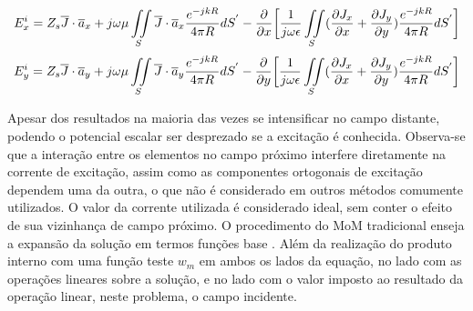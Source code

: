 \documentclass[
	12pt,				%
	openright,			%
	oneside,			%
	a4papey79r,			%
	english,			%
	brazil				%
	]{abntex2}
\begin{document}
\begin{equation}{\label{CampoExTangencialEmFunçãoJ}}
  E_{x}^i=Z_s \overline{J}\cdot \overline{a}_x+j\omega \mu \iint\limits_S \overline{J}\cdot \overline{a}_x\frac{e^{-j k R}}{4 \pi R} dS^{'} -
     \frac{\partial }{\partial x}  \biggl[ \frac{1}{j\omega \epsilon}\iint\limits_S  (\frac{\partial J_x}{\partial x}+ \frac{\partial J_y}{\partial y} ) \frac{e^{-j k R}}{4 \pi R} dS^{'}  \biggl] 
\end{equation}
\begin{equation}{\label{CampoEyTangencialEmFunçãoJ}}
  E_{y}^i=Z_s \overline{J}\cdot \overline{a}_y+j\omega \mu \iint\limits_S \overline{J}\cdot \overline{a}_y \frac{e^{-j k R}}{4 \pi R} dS^{'} -
     \frac{\partial }{\partial y}  \biggl[ \frac{1}{j\omega \epsilon}\iint\limits_S  (\frac{\partial J_x}{\partial x}+ \frac{\partial J_y}{\partial y} ) \frac{e^{-j k R}}{4 \pi R} dS^{'}  \biggl] 
\end{equation}

Apesar dos resultados na maioria das vezes se intensificar no campo distante, podendo o potencial escalar ser desprezado se a excitação é conhecida. Observa-se que a interação entre os elementos no campo próximo interfere diretamente na corrente de excitação, assim como as componentes ortogonais de excitação dependem uma da outra, o que não é considerado em outros métodos comumente utilizados. O valor da corrente utilizada é considerado ideal, sem conter o efeito de sua vizinhança de campo próximo.
O procedimento do MoM tradicional enseja a expansão da solução em termos funções base . Além da realização do produto interno com uma função teste $w_m$ em ambos os lados da equação, no lado com as operações lineares sobre a solução, e no lado com o valor imposto ao resultado da operação linear, neste problema, o campo incidente.
\end{document}
